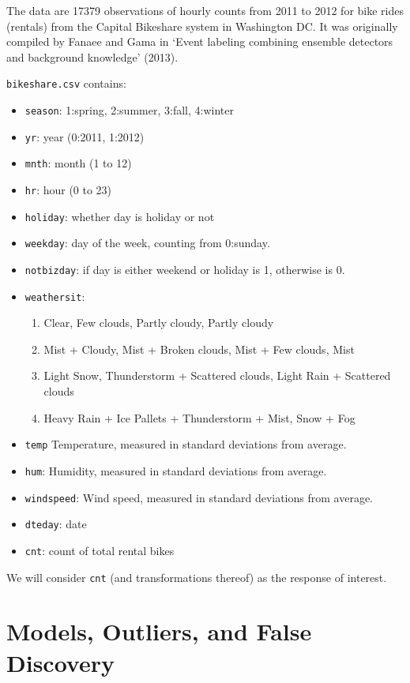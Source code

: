 \documentclass[12pt]{article}
\begin{document}
\medskip\noindent
The data are 17379 observations of hourly counts from 2011 to 2012 for bike rides (rentals)  from the Capital Bikeshare system in Washington DC. It was originally compiled by Fanaee and Gama in `Event labeling combining ensemble detectors and background knowledge' (2013).

\bigskip\noindent
{}
{\tt bikeshare.csv} contains:
\begin{itemize}
\item \texttt{season}: 1:spring, 2:summer, 3:fall, 4:winter
\item \texttt{yr}: year (0:2011, 1:2012)
\item \texttt{mnth}: month (1 to 12)
\item \texttt{hr}: hour (0 to 23)
\item \texttt{holiday}: whether day is holiday or not
\item \texttt{weekday}: day of the week, counting from 0:sunday.
\item \texttt{notbizday}: if day is either weekend or holiday is 1, otherwise is 0.
\item \texttt{weathersit}: 
\begin{enumerate} 
\item Clear, Few clouds, Partly cloudy, Partly cloudy
\item Mist + Cloudy, Mist + Broken clouds, Mist + Few clouds, Mist
\item Light Snow, Thunderstorm + Scattered clouds, Light Rain + Scattered clouds
\item Heavy Rain + Ice Pallets + Thunderstorm + Mist, Snow + Fog
\end{enumerate}
\item \texttt{temp} Temperature, measured in standard deviations from average. 
\item \texttt{hum}: Humidity, measured in standard deviations from average.
\item \texttt{windspeed}: Wind speed, measured in standard deviations from average.
\item \texttt{dteday}: date
\item \texttt{cnt}: count of total rental bikes
\end{itemize}
We will consider \texttt{cnt} (and transformations thereof) as the response of interest.


\newpage
\section{Models, Outliers, and False Discovery}
\end{document}
